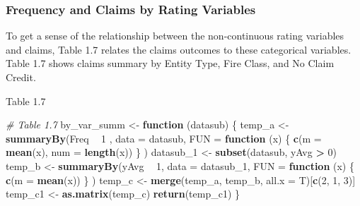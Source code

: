 \documentclass[]{book}
\newenvironment{Shaded}{\begin{snugshade}}{\end{snugshade}}
\newcommand{\KeywordTok}[1]{\textcolor[rgb]{0.13,0.29,0.53}{\textbf{#1}}}
\newcommand{\DataTypeTok}[1]{\textcolor[rgb]{0.13,0.29,0.53}{#1}}
\newcommand{\DecValTok}[1]{\textcolor[rgb]{0.00,0.00,0.81}{#1}}
\newcommand{\StringTok}[1]{\textcolor[rgb]{0.31,0.60,0.02}{#1}}
\newcommand{\CommentTok}[1]{\textcolor[rgb]{0.56,0.35,0.01}{\textit{#1}}}
\newcommand{\ControlFlowTok}[1]{\textcolor[rgb]{0.13,0.29,0.53}{\textbf{#1}}}
\newcommand{\OperatorTok}[1]{\textcolor[rgb]{0.81,0.36,0.00}{\textbf{#1}}}
\newcommand{\NormalTok}[1]{#1}
\theoremstyle{definition}
\theoremstyle{definition}
\theoremstyle{definition}
\theoremstyle{remark}
\begin{document}
\subsubsection{Frequency and Claims by Rating
Variables}\label{frequency-and-claims-by-rating-variables}

To get a sense of the relationship between the non-continuous rating
variables and claims, Table 1.7 relates the claims outcomes to these
categorical variables. Table 1.7 shows claims summary by Entity Type,
Fire Class, and No Claim Credit.

Table 1.7

\begin{Shaded}
\begin{Highlighting}[]
\CommentTok{# Table 1.7}
\NormalTok{by_var_summ <-}\StringTok{ }\ControlFlowTok{function}\NormalTok{ (datasub) \{}
\NormalTok{  temp_a <-}\StringTok{ }\KeywordTok{summaryBy}\NormalTok{(Freq }\OperatorTok{~}\StringTok{ }\DecValTok{1}\NormalTok{ , }\DataTypeTok{data =}\NormalTok{ datasub,   }
                      \DataTypeTok{FUN =} \ControlFlowTok{function}\NormalTok{ (x) \{ }\KeywordTok{c}\NormalTok{(}\DataTypeTok{m =} \KeywordTok{mean}\NormalTok{(x), }\DataTypeTok{num =} \KeywordTok{length}\NormalTok{(x)) \} )}
\NormalTok{  datasub_}\DecValTok{1}\NormalTok{ <-}\StringTok{ }\KeywordTok{subset}\NormalTok{(datasub, yAvg }\OperatorTok{>}\StringTok{ }\DecValTok{0}\NormalTok{)}
\NormalTok{  temp_b <-}\StringTok{ }\KeywordTok{summaryBy}\NormalTok{(yAvg }\OperatorTok{~}\StringTok{ }\DecValTok{1}\NormalTok{, }\DataTypeTok{data =}\NormalTok{ datasub_}\DecValTok{1}\NormalTok{,}
                      \DataTypeTok{FUN =} \ControlFlowTok{function}\NormalTok{ (x) \{ }\KeywordTok{c}\NormalTok{(}\DataTypeTok{m =} \KeywordTok{mean}\NormalTok{(x)) \} )}
\NormalTok{  temp_c <-}\StringTok{ }\KeywordTok{merge}\NormalTok{(temp_a, temp_b, }\DataTypeTok{all.x =}\NormalTok{ T)[}\KeywordTok{c}\NormalTok{(}\DecValTok{2}\NormalTok{, }\DecValTok{1}\NormalTok{, }\DecValTok{3}\NormalTok{)]}
\NormalTok{  temp_c1 <-}\StringTok{ }\KeywordTok{as.matrix}\NormalTok{(temp_c)}
  \KeywordTok{return}\NormalTok{(temp_c1)}
\NormalTok{\}}


\end{Highlighting}
\end{Shaded}
\end{document}
